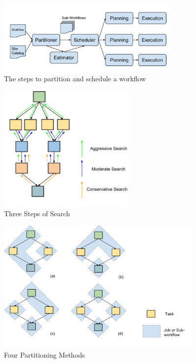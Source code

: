 \begin{figure}[lh!]
	\centering
    \includegraphics[width=0.8\textwidth]{figures/partitioning/partitioning_steps.pdf}
    \caption{The steps to partition and schedule a workflow}
    \label{fig:partitioning_steps}
\end{figure}
\begin{figure}[lh!]
	\centering
    \includegraphics[width=0.6\textwidth]{figures/partitioning/three_steps.pdf}
    \caption{Three Steps of Search}
    \label{fig:three_steps}
\end{figure}
\begin{figure}[lh!]
	\centering
    \includegraphics[width=0.9\textwidth]{figures/partitioning/four_partitioning.pdf}
    \caption{Four Partitioning Methods}
    \label{fig:four_partitioning}
\end{figure}

